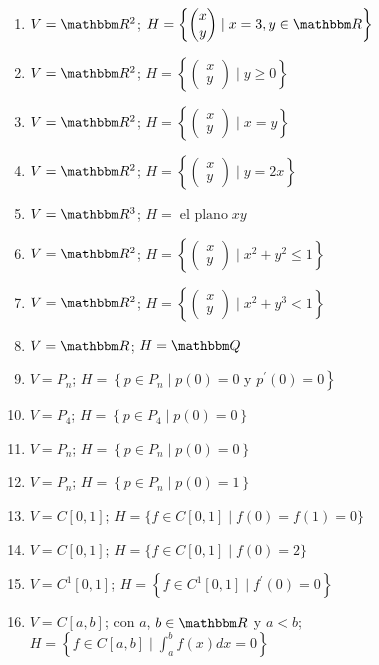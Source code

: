 \begin{enumerate}[resume]
    \item $V=\RR[2]$; $H=\left\{ \begin{pmatrix} x \\ y \end{pmatrix} \mid x=3, y \in \RR \right\}$
    \item $V=\RR[2]$; $H=\left\{ \begin{pmatrix} x \\ y \end{pmatrix} \mid y \geq 0 \right\}$\newpage
    \item $V=\RR[2]$; $H=\left\{ \begin{pmatrix} x \\ y \end{pmatrix} \mid x=y \right\}$
    \item $V=\RR[2]$; $H=\left\{ \begin{pmatrix} x \\ y \end{pmatrix} \mid y=2 x \right\}$
    \item $V=\RR[3]$; $H = \operatorname{el~plano} x y$
    \item $V=\RR[2]$; $H=\left\{ \begin{pmatrix} x \\ y \end{pmatrix} \mid x^{2}+y^{2} \leq 1\right\}$
    \item $V=\RR[2]$; $H=\left\{ \begin{pmatrix} x \\ y \end{pmatrix} \mid x^{2}+y^{3}<1\right\}$
    \item $V=\RR$; $H=\QQ$
    \item $V=P_{n}$; $H=\left\{p \in P_{n}\mid p(0)=0\right.$ y $\left.p^{\prime}(0)=0\right\}$
    \item $V=P_{4}$; $H=\left\{p \in P_{4}\mid p(0)=0\right\}$
    \item $V=P_{n}$; $H=\left\{p \in P_{n}\mid p(0)=0\right\}$
    \item $V=P_{n}$; $H=\left\{p \in P_{n}\mid p(0)=1\right\}$
    \item $V=C[0,1]$; $H=\{f \in C[0,1]\mid f(0)=f(1)=0\}$
    \item $V=C[0,1]$; $H=\{f \in C[0,1]\mid f(0)=2\}$
    \item $V=C^{1}[0,1]$; $H=\left\{f \in C^{1}[0,1]\mid f^{\prime}(0)=0\right\}$
    \item $V=C[a, b]$; con $a$, $b \in \RR$ y $a<b$; $\displaystyle H=\left\{f \in C[a, b]\mid \int_{a}^{b} f(x) d x=0\right\}$

\end{enumerate}
